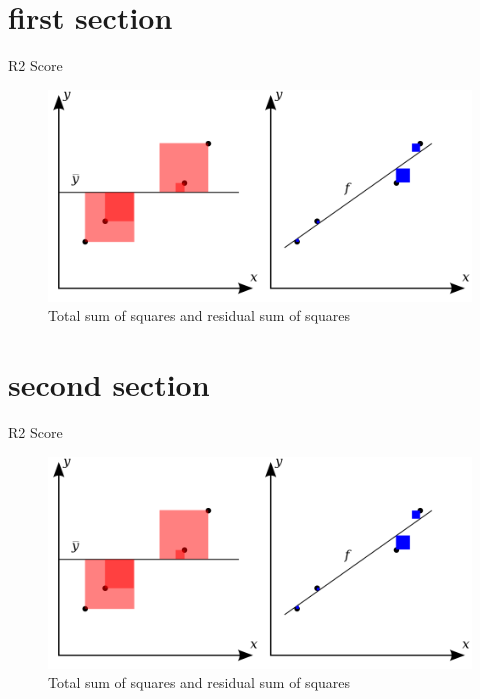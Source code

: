 \section{first section}

\begin{frame}{R2 Score}
    \begin{figure}
        \centering
        \includegraphics[width=\textwidth]{img/Coefficient_of_Determination.png}
        \caption{Total sum of squares and residual sum of squares}
    \end{figure}
\end{frame}

\section{second section}

\begin{frame}{R2 Score}
    \begin{figure}
        \centering
        \includegraphics[width=\textwidth]{img/Coefficient_of_Determination.png}
        \caption{Total sum of squares and residual sum of squares}
    \end{figure}
\end{frame}